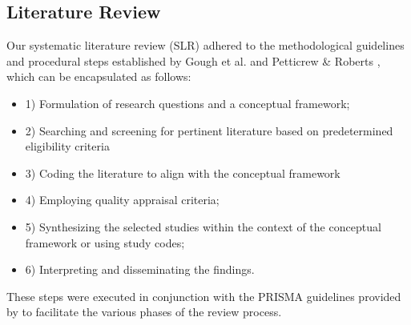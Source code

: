 \documentclass[final-report.tex]{subfiles}
\begin{document}
\subsection{Literature Review}

Our systematic literature review (SLR) adhered to the methodological guidelines and procedural steps established by Gough et al. \cite{gough2017introduction} and Petticrew \& Roberts \cite{petticrew2008systematic}, which can be encapsulated as follows:
\begin{itemize}
    \item 1) Formulation of research questions and a conceptual framework; 
    \item 2) Searching and screening for pertinent literature based on predetermined eligibility criteria
    \item 3) Coding the literature to align with the conceptual framework
    \item 4) Employing quality appraisal criteria;
    \item 5) Synthesizing the selected studies within the context of the conceptual framework or using study codes;
    \item 6) Interpreting and disseminating the findings. 
\end{itemize}
These steps were executed in conjunction with the PRISMA guidelines provided by \cite{page2021prisma} to facilitate the various phases of the review process. 
\end{document}
